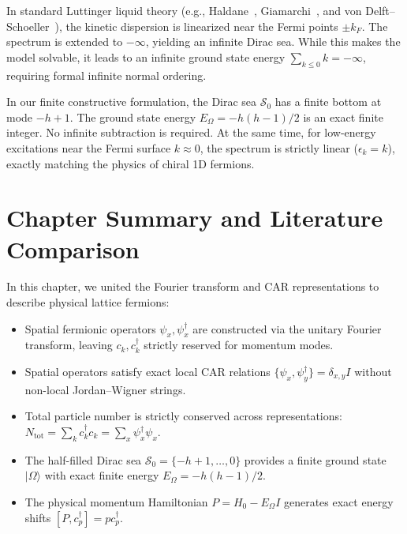 \begin{remark}
In standard Luttinger liquid theory (e.g., Haldane~\cite{haldane1981}, Giamarchi~\cite{giamarchi2004}, and von Delft--Schoeller~\cite{vondelft1998}), the kinetic dispersion is linearized near the Fermi points $\pm k_F$. The spectrum is extended to $-\infty$, yielding an infinite Dirac sea. While this makes the model solvable, it leads to an infinite ground state energy $\sum_{k \le 0} k = -\infty$, requiring formal infinite normal ordering.

In our finite constructive formulation, the Dirac sea $\mathcal{S}_0$ has a finite bottom at mode $-h+1$. The ground state energy $E_\Omega = -h(h-1)/2$ is an exact finite integer. No infinite subtraction is required. At the same time, for low-energy excitations near the Fermi surface $k \approx 0$, the spectrum is strictly linear ($\epsilon_k = k$), exactly matching the physics of chiral 1D fermions.
\end{remark}

\section{Chapter Summary and Literature Comparison}

In this chapter, we united the Fourier transform and CAR representations to describe physical lattice fermions:
\begin{itemize}
    \item Spatial fermionic operators $\psi_x, \psi_x^\dagger$ are constructed via the unitary Fourier transform, leaving $c_k, c_k^\dagger$ strictly reserved for momentum modes.
    \item Spatial operators satisfy exact local CAR relations $\{\psi_x, \psi_y^\dagger\} = \delta_{x, y} I$ without non-local Jordan--Wigner strings.
    \item Total particle number is strictly conserved across representations: $N_{\mathrm{tot}} = \sum_k c_k^\dagger c_k = \sum_x \psi_x^\dagger \psi_x$.
    \item The half-filled Dirac sea $\mathcal{S}_0 = \{-h+1, \dots, 0\}$ provides a finite ground state $|\Omega\rangle$ with exact finite energy $E_\Omega = -h(h-1)/2$.
    \item The physical momentum Hamiltonian $P = H_0 - E_\Omega I$ generates exact energy shifts $[P, c_p^\dagger] = p c_p^\dagger$.
\end{itemize}

